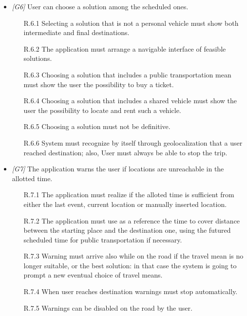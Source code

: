 \begin{itemize}
\begin{itemize}
		\end{itemize}
                  
                  
	\item \textit{[G6]} User can choose a solution among the scheduled ones. 
		\begin{itemize}
			\item [R.6.1] Selecting a solution that is not a personal vehicle must show both intermediate and final destinations.
			\item [R.6.2] The application must arrange a navigable interface of feasible solutions.
			\item [R.6.3] Choosing a solution that includes a public transportation mean must show the user the possibility to buy a ticket.
			\item [R.6.4] Choosing a solution that includes a shared vehicle must show the user the possibility to locate and rent such a vehicle.
			\item [R.6.5] Choosing a solution must not be definitive.
			\item [R.6.6] System must recognize by itself through geolocalization that a user reached destination; also, User must always be able to stop the trip.
		\end{itemize}
                  
                  
	\item \textit{[G7]} The application warns the user if locations are unreachable in the allotted time.
		\begin{itemize}
			\item[R.7.1] The application must realize if the alloted time is sufficient from either the last event, current location or manually inserted location.
			\item[R.7.2] The application must use as a reference the time to cover distance between the starting place and the destination one, using the futured scheduled time for public transportation if necessary.
			\item [R.7.3] Warning must arrive also while on the road if the travel mean is no longer suitable, or the best solution: in that case the system is going to prompt a new eventual choice of travel means.
			\item [R.7.4] When user reaches destination warnings must stop automatically.
			\item [R.7.5] Warnings can be disabled on the road by the user.
		\end{itemize}



\end{itemize}
